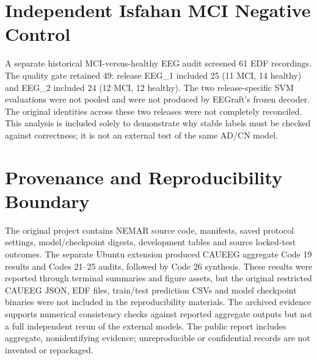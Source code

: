 \section{Independent Isfahan MCI Negative Control}
A separate historical MCI-versus-healthy EEG audit screened 61 EDF recordings. The quality gate retained 49: release EEG\_1 included 25 (11 MCI, 14 healthy) and EEG\_2 included 24 (12 MCI, 12 healthy). The two release-specific SVM evaluations were not pooled and were not produced by EEGraft's frozen decoder. The original identities across these two releases were not completely reconciled. This analysis is included solely to demonstrate why stable labels must be checked against correctness; it is not an external test of the same AD/CN model.

\section{Provenance and Reproducibility Boundary}
The original project contains NEMAR source code, manifests, saved protocol settings, model/checkpoint digests, development tables and source locked-test outcomes. The separate Ubuntu extension produced CAUEEG aggregate Code 19 results and Codes 21--25 audits, followed by Code 26 synthesis. These results were reported through terminal summaries and figure assets, but the original restricted CAUEEG JSON, EDF files, train/test prediction CSVs and model checkpoint binaries were not included in the reproducibility materials. The archived evidence supports numerical consistency checks against reported aggregate outputs but not a full independent rerun of the external models. The public report includes aggregate, nonidentifying evidence; unreproducible or confidential records are not invented or repackaged.
